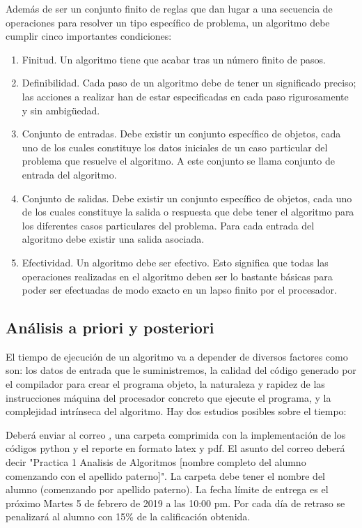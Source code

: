 \documentclass[conference]{IEEEtran}
\begin{document}
Además de ser un conjunto finito de reglas que dan lugar a una secuencia de operaciones para resolver un tipo específico de problema, un algoritmo debe cumplir cinco importantes condiciones:

\begin{enumerate}
\item Finitud. Un algoritmo tiene que acabar tras un número finito de pasos.
\item Definibilidad. Cada paso de un algoritmo debe de tener un significado preciso; las acciones a realizar han de estar especificadas en cada paso rigurosamente y sin ambigüedad.
\item Conjunto de entradas. Debe existir un conjunto específico de objetos, cada uno de los cuales constituye los datos iniciales de un caso particular del problema que resuelve el algoritmo. A este conjunto se llama conjunto de entrada del algoritmo.
\item Conjunto de salidas. Debe existir un conjunto específico de objetos, cada uno de los cuales constituye la salida o respuesta que debe tener el algoritmo para los diferentes casos particulares del problema. Para cada entrada del algoritmo debe existir una salida asociada.
\item Efectividad. Un algoritmo debe ser efectivo. Esto significa que todas las operaciones realizadas en el algoritmo deben ser lo bastante básicas para poder ser efectuadas de modo exacto en un lapso finito por el procesador.
\end{enumerate}

\subsection{An\'alisis a priori y posteriori}

El tiempo de ejecución de un algoritmo va a depender de diversos factores como son: los datos de entrada que le suministremos, la calidad del código generado por el compilador para crear el programa objeto, la naturaleza y rapidez de las instrucciones máquina del procesador concreto que ejecute el programa, y la complejidad intrínseca del algoritmo. Hay dos estudios posibles sobre el tiempo:



Deber\'a enviar al correo \href{miriam.pescador@gmail.com}, una carpeta comprimida con la implementaci\'on de los c\'odigos python y el reporte en formato latex y pdf.
El asunto del correo deber\'a decir "Practica 1 Analisis de Algoritmos [nombre completo del alumno comenzando con el apellido paterno]".
La carpeta debe tener el nombre del alumno (comenzando por apellido paterno).
La fecha l\'imite de entrega es el pr\'oximo Martes 5 de febrero de 2019 a las 10:00 pm. Por cada d\'ia de retraso se penalizar\'a al alumno con 15\% de la calificaci\'on obtenida. 
\end{document}
